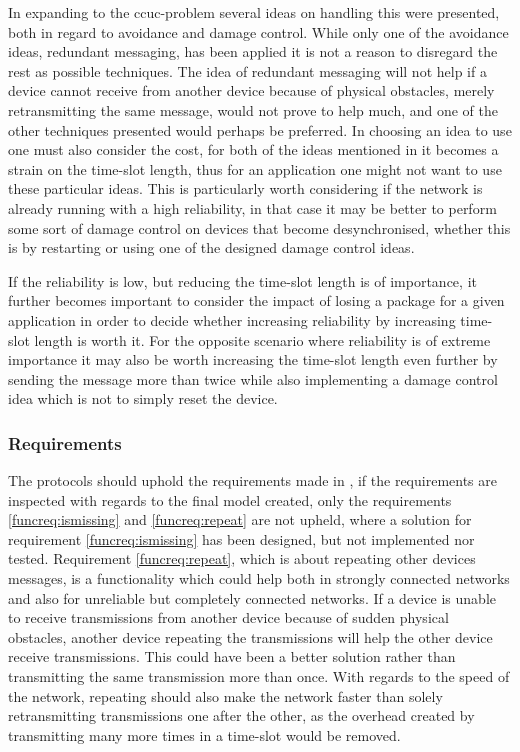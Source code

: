 In expanding to the \gls{ccuc}-problem several ideas on handling this were presented, both in regard to avoidance and damage control.
While only one of the avoidance ideas, redundant messaging, has been applied it is not a reason to disregard the rest as possible techniques.
The idea of redundant messaging will not help if a device cannot receive from another device because of physical obstacles, merely retransmitting the same message, would not prove to help much, and one of the other techniques presented would perhaps be preferred.
In choosing an idea to use one must also consider the cost, for both of the ideas mentioned in  it becomes a strain on the time-slot length, thus for an application one might not want to use these particular ideas.
This is particularly worth considering if the network is already running with a high reliability, in that case it may be better to perform some sort of damage control on devices that become desynchronised, whether this is by restarting or using one of the designed damage control ideas. 

If the reliability is low, but reducing the time-slot length is of importance, it further becomes important to consider the impact of losing a package for a given application in order to decide whether increasing reliability by increasing time-slot length is worth it.
For the opposite scenario where reliability is of extreme importance it may also be worth increasing the time-slot length even further by sending the message more than twice while also implementing a damage control idea which is not to simply reset the device.

\subsubsection{Requirements}
The protocols should uphold the requirements made in , if the requirements are inspected with regards to the final model created, only the requirements \ref{funcreq:ismissing} and \ref{funcreq:repeat} are not upheld, where a solution for requirement \ref{funcreq:ismissing} has been designed, but not implemented nor tested.
Requirement \ref{funcreq:repeat}, which is about repeating other devices messages, is a functionality which could help both in strongly connected networks and also for unreliable but completely connected networks.
If a device is unable to receive transmissions from another device because of sudden physical obstacles, another device repeating the transmissions will help the other device receive transmissions.
This could have been a better solution rather than transmitting the same transmission more than once.
With regards to the speed of the network, repeating should also make the network faster than solely retransmitting transmissions one after the other, as the overhead created by transmitting many more times in a time-slot would be removed.

